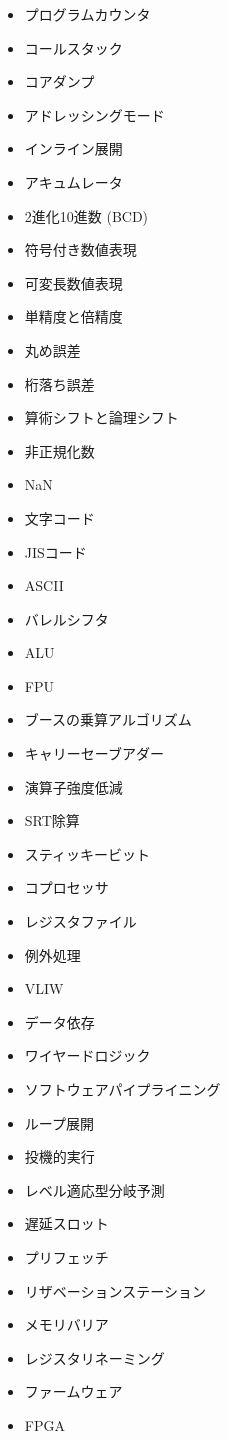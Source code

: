 \documentclass[a4j, titlepage, 11pt]{jsarticle}
\begin{document}
\begin{multicols}{2}
\begin{itemize}
	\item プログラムカウンタ
	\item コールスタック
	\item コアダンプ
	\item アドレッシングモード
	\item インライン展開
	\item アキュムレータ
	\item 2進化10進数 (BCD)	
	\item 符号付き数値表現
	\item 可変長数値表現	
	\item 単精度と倍精度
	\item 丸め誤差
	\item 桁落ち誤差
	\item 算術シフトと論理シフト
	\item 非正規化数
	\item NaN
	\item 文字コード
	\item JISコード
	\item ASCII
	\item バレルシフタ
	\item ALU
	\item FPU
	\item ブースの乗算アルゴリズム
	\item キャリーセーブアダー
	\item 演算子強度低減
	\item SRT除算
	\item スティッキービット
	\item コプロセッサ
	\item レジスタファイル
	\item 例外処理
	\item VLIW
	\item データ依存
	\item ワイヤードロジック
	\item ソフトウェアパイプライニング
	\item ループ展開
	\item 投機的実行
	\item レベル適応型分岐予測
	\item 遅延スロット
	\item プリフェッチ
	\item リザベーションステーション
	\item メモリバリア
	\item レジスタリネーミング
	\item ファームウェア
	\item FPGA

\end{itemize}
\end{multicols}
\end{document}

